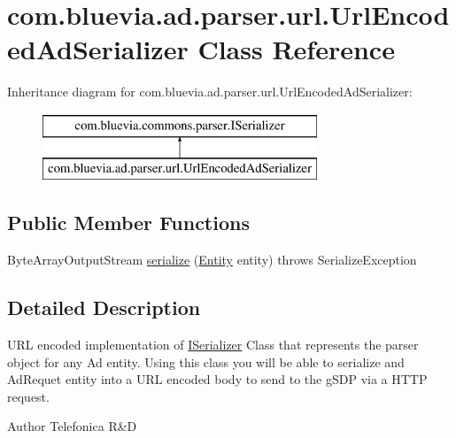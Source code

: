 \hypertarget{classcom_1_1bluevia_1_1ad_1_1parser_1_1url_1_1UrlEncodedAdSerializer}{
\section{com.bluevia.ad.parser.url.UrlEncodedAdSerializer Class Reference}
\label{classcom_1_1bluevia_1_1ad_1_1parser_1_1url_1_1UrlEncodedAdSerializer}
}
Inheritance diagram for com.bluevia.ad.parser.url.UrlEncodedAdSerializer:\begin{figure}[H]
\begin{center}
\leavevmode
\includegraphics[height=2.000000cm]{classcom_1_1bluevia_1_1ad_1_1parser_1_1url_1_1UrlEncodedAdSerializer}
\end{center}
\end{figure}
\subsection*{Public Member Functions}
\begin{DoxyCompactItemize}
\item 
ByteArrayOutputStream \hyperlink{classcom_1_1bluevia_1_1ad_1_1parser_1_1url_1_1UrlEncodedAdSerializer_ac97bc95270a35997207d9f4dcbd9b7b8}{serialize} (\hyperlink{interfacecom_1_1bluevia_1_1commons_1_1Entity}{Entity} entity)  throws SerializeException 
\end{DoxyCompactItemize}


\subsection{Detailed Description}
URL encoded implementation of \hyperlink{interfacecom_1_1bluevia_1_1commons_1_1parser_1_1ISerializer}{ISerializer} Class that represents the parser object for any Ad entity. Using this class you will be able to serialize and AdRequet entity into a URL encoded body to send to the gSDP via a HTTP request.

\begin{DoxyAuthor}{Author}
Telefonica R\&D 
\end{DoxyAuthor}


